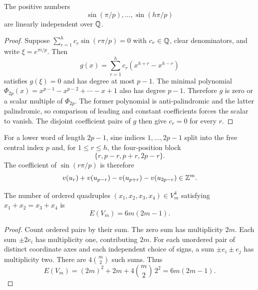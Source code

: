 \begin{lemma}
\label{lem:prime-sines}
The positive numbers
\[
  \sin(\pi/p),\ldots,\sin(h\pi/p)
\]
are linearly independent over $\mathbb Q$.
\end{lemma}

\begin{proof}
Suppose $\sum_{r=1}^h c_r\sin(r\pi/p)=0$ with $c_r\in\mathbb Q$, clear
denominators, and write $\xi=e^{\pi i/p}$.  Then
\[
  g(x)=\sum_{r=1}^h c_r(x^{h+r}-x^{h-r})
\]
satisfies $g(\xi)=0$ and has degree at most $p-1$.  The minimal polynomial
$\Phi_{2p}(x)=x^{p-1}-x^{p-2}+\cdots-x+1$ also has degree $p-1$.  Therefore
$g$ is zero or a scalar multiple of $\Phi_{2p}$.  The former polynomial is
anti-palindromic and the latter palindromic, so comparison of leading and
constant coefficients forces the scalar to vanish.  The disjoint coefficient
pairs of $g$ then give $c_r=0$ for every $r$.
\end{proof}

For a lower word of length $2p-1$, sine indices $1,\ldots,2p-1$ split into
the free central index $p$ and, for $1\le r\le h$, the four-position block
\[
  \{r,p-r,p+r,2p-r\}.
\]
The coefficient of $\sin(r\pi/p)$ is therefore
\begin{equation}
  v(u_r)+v(u_{p-r})-v(u_{p+r})-v(u_{2p-r})\in\mathbb Z^m.                        \label{eq:block-vector}
\end{equation}

\begin{lemma}
\label{lem:cross-energy}
\leavevmode\par\noindent
The number of ordered quadruples $(x_1,x_2,x_3,x_4)\in V_m^4$ satisfying
$x_1+x_2=x_3+x_4$ is
\begin{equation}
  E(V_m)=6m(2m-1).
  \label{eq:cross-energy}
\end{equation}
\end{lemma}

\begin{proof}
Count ordered pairs by their sum.  The zero sum has multiplicity $2m$.
Each sum $\pm2e_i$ has multiplicity one, contributing $2m$.  For each
unordered pair of distinct coordinate axes and each independent choice of
signs, a sum $\pm e_i\pm e_j$ has multiplicity two.  There are
$4\binom m2$ such sums.  Thus
\[
  E(V_m)=(2m)^2+2m+4\binom m2\,2^2
        =6m(2m-1).
\]
\end{proof}

